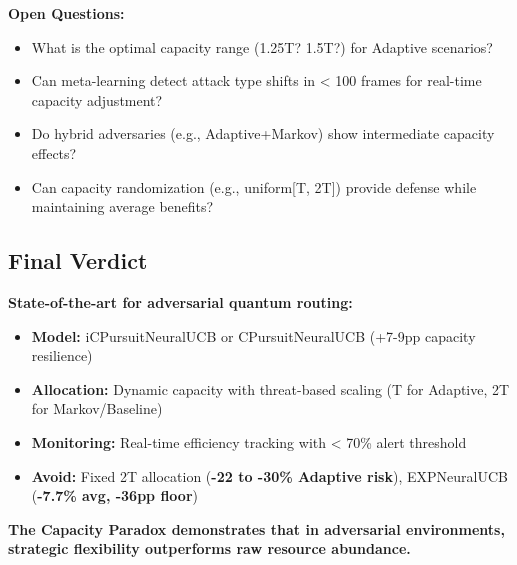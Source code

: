 \documentclass[11pt,a4paper]{article}
\newcommand{\critical}[1]{\textcolor{criticalcolor}{\textbf{#1}}}
\newcommand{\success}[1]{\textcolor{successcolor}{\textbf{#1}}}
\begin{document}
\textbf{Open Questions:}
\begin{itemize}
\vspace{-0.2cm}
\item What is the optimal capacity range (1.25T? 1.5T?) for Adaptive scenarios?
\vspace{-0.2cm}
\item Can meta-learning detect attack type shifts in < 100 frames for real-time capacity adjustment?
\vspace{-0.2cm}
\item Do hybrid adversaries (e.g., Adaptive+Markov) show intermediate capacity effects?
\vspace{-0.2cm}
\item Can capacity randomization (e.g., uniform[T, 2T]) provide defense while maintaining average benefits?
\end{itemize}

\subsection{Final Verdict}

\textbf{State-of-the-art for adversarial quantum routing:}
\begin{itemize}
\vspace{-0.2cm}
\item \textbf{Model:} iCPursuitNeuralUCB or CPursuitNeuralUCB (+7-9pp capacity resilience)
\vspace{-0.2cm}
\item \textbf{Allocation:} Dynamic capacity with threat-based scaling (T for Adaptive, 2T for Markov/Baseline)
\vspace{-0.2cm}
\item \textbf{Monitoring:} Real-time efficiency tracking with < 70\% alert threshold
\vspace{-0.2cm}
\item \textbf{Avoid:} Fixed 2T allocation (\critical{-22 to -30\% Adaptive risk}), EXPNeuralUCB (\critical{-7.7\% avg, -36pp floor})
\end{itemize}

\vspace{0.3cm}

\begin{center}
\textbf{The Capacity Paradox demonstrates that in adversarial environments, \\
\success{strategic flexibility outperforms raw resource abundance.}}
\end{center}
\end{document}
